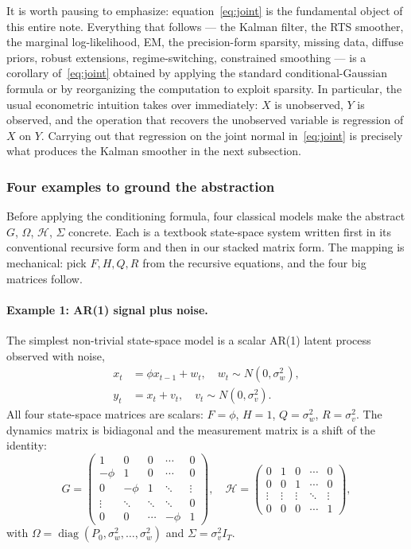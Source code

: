 \documentclass[11pt]{article}
\newcommand{\diag}{\operatorname{diag}}
\begin{document}
It is worth pausing to emphasize: equation~\eqref{eq:joint} is the
fundamental object of this entire note.  Everything that follows ---
the Kalman filter, the RTS smoother, the marginal log-likelihood,
EM, the precision-form sparsity, missing data, diffuse priors,
robust extensions, regime-switching, constrained smoothing --- is a
corollary of~\eqref{eq:joint} obtained by applying the standard
conditional-Gaussian formula or by reorganizing the computation to
exploit sparsity.  In particular, the usual econometric intuition
takes over immediately: $X$ is unobserved, $Y$ is observed, and the
operation that recovers the unobserved variable is regression of
$X$ on $Y$.  Carrying out that regression on the joint normal
in~\eqref{eq:joint} is precisely what produces the Kalman smoother
in the next subsection.

\subsubsection{Four examples to ground the abstraction}
\label{sec:examples}

Before applying the conditioning formula, four classical models make
the abstract $G$, $\Omega$, $\mathcal H$, $\Sigma$ concrete.  Each is a
textbook state-space system written first in its conventional
recursive form and then in our stacked matrix form.  The mapping is
mechanical: pick $F,H,Q,R$ from the recursive equations, and the four
big matrices follow.

\paragraph{Example 1: AR(1) signal plus noise.}

The simplest non-trivial state-space model is a scalar AR(1) latent
process observed with noise,
\begin{align}
x_t &= \phi x_{t-1}+w_t,
        \quad w_t\sim N(0,\sigma_w^2),\\
y_t &= x_t+v_t,
        \quad v_t\sim N(0,\sigma_v^2).
\end{align}
All four state-space matrices are scalars: $F=\phi$, $H=1$,
$Q=\sigma_w^2$, $R=\sigma_v^2$.  The dynamics matrix is bidiagonal and
the measurement matrix is a shift of the identity:
\begin{equation}
G=\begin{pmatrix}
1 & 0 & 0 & \cdots & 0\\
-\phi & 1 & 0 & \cdots & 0\\
0 & -\phi & 1 & \ddots & \vdots\\
\vdots & \ddots & \ddots & \ddots & 0\\
0 & 0 & \cdots & -\phi & 1
\end{pmatrix},
\quad
\mathcal H=\begin{pmatrix}
0 & 1 & 0 & \cdots & 0\\
0 & 0 & 1 & \cdots & 0\\
\vdots & \vdots & \vdots & \ddots & \vdots\\
0 & 0 & 0 & \cdots & 1
\end{pmatrix},
\end{equation}
with $\Omega=\diag(P_0,\sigma_w^2,\ldots,\sigma_w^2)$ and
$\Sigma=\sigma_v^2 I_T$.
\end{document}
